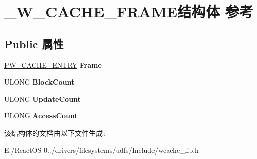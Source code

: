 \hypertarget{struct___w___c_a_c_h_e___f_r_a_m_e}{}\section{\+\_\+\+W\+\_\+\+C\+A\+C\+H\+E\+\_\+\+F\+R\+A\+M\+E结构体 参考}
\label{struct___w___c_a_c_h_e___f_r_a_m_e}
\subsection*{Public 属性}
\begin{DoxyCompactItemize}
\item 
\mbox{\label{struct___w___c_a_c_h_e___f_r_a_m_e_a68531d4f972f0697d7f58f67b0e3f758}} 
\hyperlink{struct___w___c_a_c_h_e___e_n_t_r_y}{P\+W\+\_\+\+C\+A\+C\+H\+E\+\_\+\+E\+N\+T\+RY} {\bfseries Frame}
\item 
\mbox{\label{struct___w___c_a_c_h_e___f_r_a_m_e_ab1a0079fb6a306525a7db16a0dc3748a}} 
U\+L\+O\+NG {\bfseries Block\+Count}
\item 
\mbox{\label{struct___w___c_a_c_h_e___f_r_a_m_e_ab5e9e6e5e2df3f99acbf1d73c3b80011}} 
U\+L\+O\+NG {\bfseries Update\+Count}
\item 
\mbox{\label{struct___w___c_a_c_h_e___f_r_a_m_e_a63a98b2afb2cf0daeb6600099445bcb9}} 
U\+L\+O\+NG {\bfseries Access\+Count}
\end{DoxyCompactItemize}


该结构体的文档由以下文件生成\+:\begin{DoxyCompactItemize}
\item 
E\+:/\+React\+O\+S-\/0../drivers/filesystems/udfs/\+Include/wcache\+\_\+lib.\+h\end{DoxyCompactItemize}
